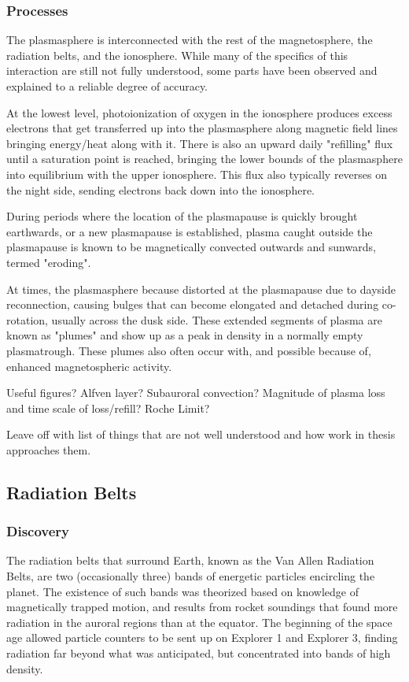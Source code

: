 \subsubsection{Processes}
The plasmasphere is interconnected with the rest of the magnetosphere, the radiation belts, and the ionosphere. While many of the specifics of this interaction are still not fully understood, some parts have been observed and explained to a reliable degree of accuracy. 

At the lowest level, photoionization of oxygen in the ionosphere produces excess electrons that get transferred up into the plasmasphere along magnetic field lines bringing energy/heat along with it. There is also an upward daily "refilling" flux until a saturation point is reached, bringing the lower bounds of the plasmasphere into equilibrium with the upper ionosphere. This flux also typically reverses on the night side, sending electrons back down into the ionosphere.

During periods where the location of the plasmapause is quickly brought earthwards, or a new plasmapause is established, plasma caught outside the plasmapause is known to be magnetically convected outwards and sunwards\cite{ErosionRecoveryPlasmasphere}, termed "eroding". 

At times, the plasmasphere because distorted at the plasmapause due to dayside reconnection, causing bulges that can become elongated and detached during co-rotation, usually across the dusk side. These extended segments of plasma are known as "plumes" and show up as a peak in density in a normally empty plasmatrough. These plumes also often occur with, and possible because of, enhanced magnetospheric activity\cite{EvolutionPlasmasphericIons}.

\note Useful figures?  Alfven layer? Subauroral convection? Magnitude of plasma loss and time scale of loss/refill? Roche Limit?

\note Leave off with list of things that are not well understood and how work in thesis approaches them.

\subsection{Radiation Belts}

\subsubsection{Discovery}
The radiation belts that surround Earth, known as the Van Allen Radiation Belts, are two (occasionally three\cite{LinksBetweenPlasmapauseRadiationBelt}) bands of energetic particles encircling the planet. The existence of such bands was theorized based on knowledge of magnetically trapped motion, and results from rocket soundings that found more radiation in the auroral regions than at the equator.  The beginning of the space age allowed particle counters to be sent up on Explorer 1 and Explorer 3, finding radiation far beyond what was anticipated, but concentrated into bands of high density\cite{MagnetoHistory}.

